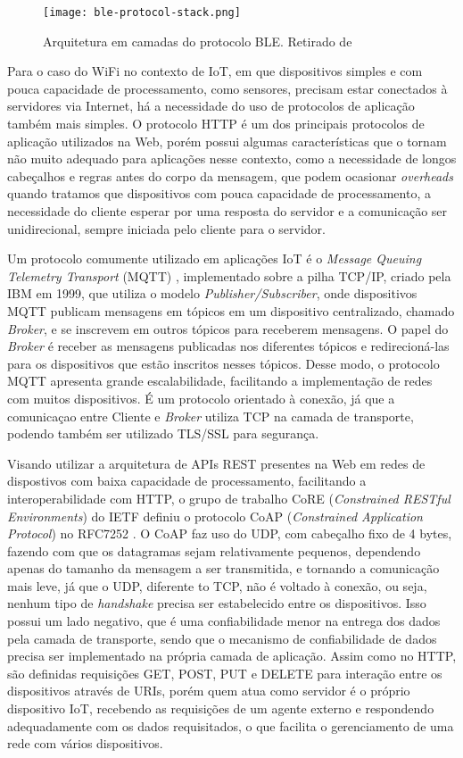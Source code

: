\documentclass[../monografia.tex]{subfiles}
\begin{document}
\begin{figure}[h]
\centering
\texttt{[image: ble-protocol-stack.png]}
\caption{Arquitetura em camadas do protocolo BLE. Retirado de \cite{ble-protocol-stack}}
\label{fig:ble-stack}
\end{figure}

Para o caso do WiFi no contexto de IoT, em que dispositivos simples e com pouca capacidade de processamento, como sensores, precisam estar conectados à servidores via Internet, há a necessidade do uso  de protocolos de aplicação também mais simples. O protocolo HTTP é um dos principais protocolos de aplicação utilizados na Web, porém possui algumas características que o tornam não muito adequado para aplicações nesse contexto, como a necessidade de longos cabeçalhos e regras antes do corpo da mensagem, que podem ocasionar \textit{overheads} quando tratamos que dispositivos com pouca capacidade de processamento, a necessidade do cliente esperar por uma resposta do servidor e a comunicação ser unidirecional, sempre iniciada pelo cliente para o servidor.

Um protocolo comumente utilizado em aplicações IoT é o \textit{Message Queuing Telemetry Transport} (MQTT) \cite{mqtt-specification}, implementado sobre a pilha TCP/IP, criado pela IBM em 1999, que utiliza o modelo \textit{Publisher/Subscriber}, onde dispositivos MQTT publicam mensagens em tópicos em um dispositivo centralizado, chamado \textit{Broker}, e se inscrevem em outros tópicos para receberem mensagens. O papel do \textit{Broker} é receber as mensagens publicadas nos diferentes tópicos e redirecioná-las para os dispositivos que estão inscritos nesses tópicos. Desse modo, o protocolo MQTT apresenta grande escalabilidade, facilitando a implementação de redes com muitos dispositivos. É um protocolo orientado à conexão, já que a comunicaçao entre Cliente e \textit{Broker} utiliza TCP na camada de transporte, podendo também ser utilizado TLS/SSL para segurança. 

Visando utilizar a arquitetura de APIs REST presentes na Web em redes de dispostivos com baixa capacidade de processamento, facilitando a interoperabilidade com HTTP, o grupo de trabalho CoRE (\textit{Constrained RESTful Environments}) do IETF definiu o protocolo CoAP (\textit{Constrained Application Protocol}) no RFC7252 \cite{coap-specification}. O CoAP faz uso do UDP, com cabeçalho fixo de 4 bytes, fazendo com que os datagramas sejam relativamente pequenos, dependendo apenas do tamanho da mensagem a ser transmitida, e tornando a comunicação mais leve, já que o UDP, diferente to TCP, não é voltado à conexão, ou seja, nenhum tipo de \textit{handshake} precisa ser estabelecido entre os dispositivos. Isso possui um lado negativo, que é uma confiabilidade menor na entrega dos dados pela camada de transporte, sendo que o mecanismo de confiabilidade de dados precisa ser implementado na própria camada de aplicação. Assim como no HTTP, são definidas requisições GET, POST, PUT e DELETE para interação entre os dispositivos através de URIs, porém quem atua como servidor é o próprio dispositivo IoT, recebendo as requisições de um agente externo e respondendo adequadamente com os dados requisitados, o que facilita o gerenciamento de uma rede com vários dispositivos. 
\end{document}
